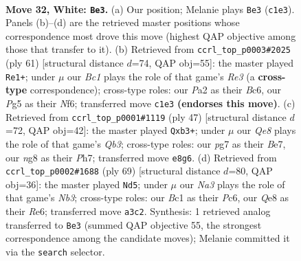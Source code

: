 \documentclass[11pt]{article}
\begin{document}
\clearpage

\begin{figure}[p]\centering
\begin{subfigure}{0.46\textwidth}\centering
\resizebox{\linewidth}{!}{%
\newchessgame
\chessboard[
  setfen={4Q1nr/2r3p1/1k6/2p3Pp/2P2P1q/N7/PP4K1/1RB5 w - - 1 32},
  showmover=false,
  pgfstyle=straightmove, color=movearrow, markmove={c1-e3}
]}
\caption{}
\end{subfigure}\hfill
\begin{subfigure}{0.46\textwidth}\centering
\resizebox{\linewidth}{!}{%
\newchessgame
\chessboard[
  setfen={6k1/6p1/2b1rnp1/1p1p4/1P1Q4/6P1/r2N1R1P/6K1 b - - 5 31},
  showmover=false,
  pgfstyle=straightmove, color=movearrow, markmove={e6-e1}
]}
\caption{}
\end{subfigure}
\\[4pt]
\begin{subfigure}{0.46\textwidth}\centering
\resizebox{\linewidth}{!}{%
\newchessgame
\chessboard[
  setfen={4k2r/4b2p/1qnp1p1Q/4pP2/6P1/1P6/4N1BP/1K1R3R b k - 0 24},
  showmover=false,
  pgfstyle=straightmove, color=movearrow, markmove={b6-b3}
]}
\caption{}
\end{subfigure}\hfill
\begin{subfigure}{0.46\textwidth}\centering
\resizebox{\linewidth}{!}{%
\newchessgame
\chessboard[
  setfen={8/p1p2k2/1np1rp2/7r/2p1NR1P/8/PPR2PK1/8 b - - 1 35},
  showmover=false,
  pgfstyle=straightmove, color=movearrow, markmove={b6-d5}
]}
\caption{}
\end{subfigure}
\caption{\textbf{Move 32, White: \texttt{Be3}.} (a) Our position; Melanie plays \texttt{Be3} (\texttt{c1e3}). Panels (b)--(d) are the retrieved master positions whose correspondence most drove this move (highest QAP objective among those that transfer to it). (b) Retrieved from \texttt{ccrl\_top\_p0003\#2025} (ply 61) [structural distance $d$=74, QAP obj=55]: the master played \texttt{Re1+}; under $\mu$ our \emph{Bc1} plays the role of that game's \emph{Re3} (a \textbf{cross-type} correspondence); cross-type roles: our \emph{P}a2 as their \emph{B}c6, our \emph{P}g5 as their \emph{N}f6; transferred move \texttt{c1e3} \textbf{(endorses this move)}. (c) Retrieved from \texttt{ccrl\_top\_p0001\#1119} (ply 47) [structural distance $d$=72, QAP obj=42]: the master played \texttt{Qxb3+}; under $\mu$ our \emph{Qe8} plays the role of that game's \emph{Qb3}; cross-type roles: our \emph{p}g7 as their \emph{B}e7, our \emph{n}g8 as their \emph{P}h7; transferred move \texttt{e8g6}. (d) Retrieved from \texttt{ccrl\_top\_p0002\#1688} (ply 69) [structural distance $d$=80, QAP obj=36]: the master played \texttt{Nd5}; under $\mu$ our \emph{Na3} plays the role of that game's \emph{Nb3}; cross-type roles: our \emph{B}c1 as their \emph{P}c6, our \emph{Q}e8 as their \emph{R}e6; transferred move \texttt{a3c2}. Synthesis: 1 retrieved analog transferred to \texttt{Be3} (summed QAP objective 55, the strongest correspondence among the candidate moves); Melanie committed it via the \texttt{search} selector.}
\label{fig:thought-m62}
\end{figure}
\end{document}
